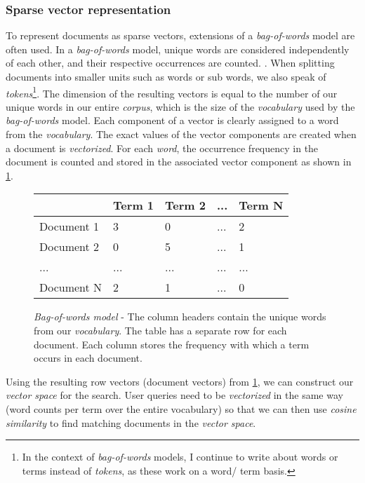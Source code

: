 \documentclass{article}
\begin{document}
\subsubsection*{Sparse vector representation}
To represent documents as sparse vectors, extensions of a \textit{bag-of-words} model are often used. In a \textit{bag-of-words} model, unique words are considered independently of each other, and their respective occurrences are counted. \cite[pp.~13ff]{eisensteinNLP}. When splitting documents into smaller units such as words or sub words, we also speak of \textit{tokens}\footnote{In the context of \textit{bag-of-words} models, I continue to write about words or terms instead of \textit{tokens}, as these work on a word/ term basis.}. The dimension of the resulting vectors is equal to the number of our unique words in our entire \textit{corpus}, which is the size of the \textit{vocabulary} used by the \textit{bag-of-words} model. Each component of a vector is clearly assigned to a word from the \textit{vocabulary}. The exact values of the vector components are created when a document is \textit{vectorized}. For each \textit{word}, the occurrence frequency in the document is counted and stored in the associated vector component as shown in \cref{cbowTable}. 

\begin{figure}[h!]
\centering
\begin{tabular}{ |p{2cm}||p{2cm}|p{2cm}|p{2cm}| p{2cm} | }
 \hline
  & Term 1 & Term 2 & ... & Term N  \\
 \hline
 Document 1   & 3 & 0 &  ... &  2 \\
 Document 2&   0  & 5 & ...  &1 \\
 ... & ... & ... & ...& ...\\
 Document N   &2 & 1& ... & 0\\
 \hline
\end{tabular}
\caption{\textit{Bag-of-words model} - The column headers contain the unique words from our \textit{vocabulary}. The table has a separate row for each document. Each column stores the frequency with which a term occurs in each document.}
\label{cbowTable}
\end{figure}

Using the resulting row vectors (document vectors) from \cref{cbowTable}, we can construct our \textit{vector space} for the search. User queries need to be \textit{vectorized} in the same way (word counts per term over the entire vocabulary) so that we can then use \textit{cosine similarity} to find matching documents in the \textit{vector space}. 
\end{document}
